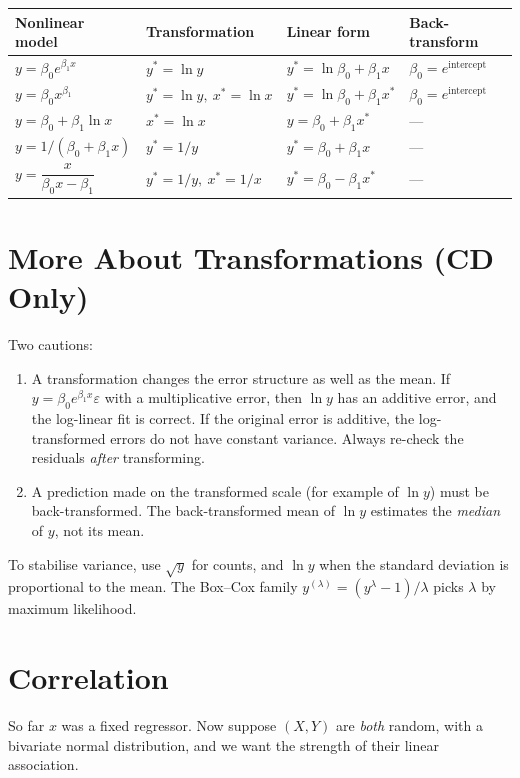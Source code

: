 \begin{center}
\begin{tabular}{llll}
\toprule
Nonlinear model & Transformation & Linear form & Back-transform \\
\midrule
$y=\beta_0e^{\beta_1x}$ & $y^*=\ln y$ & $y^*=\ln\beta_0+\beta_1x$ & $\beta_0=e^{\text{intercept}}$ \\
$y=\beta_0x^{\beta_1}$ & $y^*=\ln y,\ x^*=\ln x$ & $y^*=\ln\beta_0+\beta_1x^*$ & $\beta_0=e^{\text{intercept}}$ \\
$y=\beta_0+\beta_1\ln x$ & $x^*=\ln x$ & $y=\beta_0+\beta_1x^*$ & --- \\
$y=1/(\beta_0+\beta_1x)$ & $y^*=1/y$ & $y^*=\beta_0+\beta_1x$ & --- \\
$y=\dfrac x{\beta_0x-\beta_1}$ & $y^*=1/y,\ x^*=1/x$ & $y^*=\beta_0-\beta_1x^*$ & --- \\
\bottomrule
\end{tabular}
\end{center}

\section{More About Transformations (CD Only)}

Two cautions:
\begin{enumerate}
  \item A transformation changes the error structure as well as the mean. If $y=\beta_0e^{\beta_1x}\varepsilon$ with a multiplicative error, then $\ln y$ has an additive error, and the log-linear fit is correct. If the original error is additive, the log-transformed errors do not have constant variance. Always re-check the residuals \emph{after} transforming.
  \item A prediction made on the transformed scale (for example of $\ln y$) must be back-transformed. The back-transformed mean of $\ln y$ estimates the \emph{median} of $y$, not its mean.
\end{enumerate}
To stabilise variance, use $\sqrt y$ for counts, and $\ln y$ when the standard deviation is proportional to the mean. The Box--Cox family $y^{(\lambda)}=(y^\lambda-1)/\lambda$ picks $\lambda$ by maximum likelihood.

\section{Correlation}

So far $x$ was a fixed regressor. Now suppose $(X,Y)$ are \emph{both} random, with a bivariate normal distribution, and we want the strength of their linear association.

